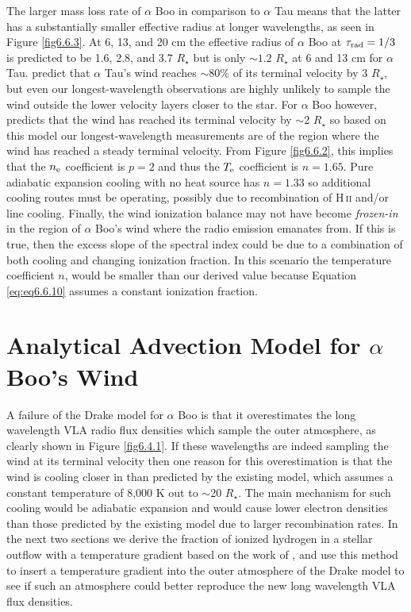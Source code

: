 The larger mass loss rate of $\alpha$ Boo in comparison to $\alpha$ Tau means that the latter has a substantially smaller effective radius at longer wavelengths, as seen in Figure \ref{fig6.6.3}. At 6, 13, and 20 cm the effective radius of $\alpha$ Boo at $\tau _{\rm{rad}}=1/3$ is predicted to be 1.6, 2.8, and 3.7 $R_{\star}$ but is only $\sim 1.2$ $R_{\star}$ at 6 and 13 cm for $\alpha$ Tau. \cite{robinson_1998} predict that $\alpha$ Tau's wind reaches $\sim$80\% of its terminal velocity by 3 $R_{\star}$, but even our longest-wavelength observations are highly unlikely to sample the wind outside the lower velocity layers closer to the star. For $\alpha$ Boo however, \cite{drake_1985} predicts that the wind has reached its terminal velocity by $\sim$2 $R_{\star}$ so based on this model our longest-wavelength measurements are of the region where the wind has reached a steady terminal velocity. From Figure \ref{fig6.6.2}, this implies that the $n_{\rm{e}}$ coefficient is $p=2$ and thus the $T_{\rm{e}}$ coefficient is $n=1.65$. Pure adiabatic expansion cooling with no heat source has $n=1.33$ so additional cooling routes must be operating, possibly due to recombination of H\,\textsc{ii} and/or line cooling. Finally, the wind ionization balance may not have become \textit{frozen-in} in the region of $\alpha$ Boo's wind where the radio emission emanates from. If this is true, then the excess slope of the spectral index could be due to a combination of both cooling and changing ionization fraction. In this scenario the temperature coefficient $n$, would be smaller than our derived value because Equation \ref{eq:eq6.6.10} assumes a constant ionization fraction.

\section{Analytical Advection Model for $\alpha$ Boo's Wind}
\label{sec:6.7}
A failure of the Drake model for $\alpha$ Boo is that it overestimates the long wavelength VLA radio flux densities which sample the outer atmosphere, as clearly shown in Figure \ref{fig6.4.1}. If these wavelengths are indeed sampling the wind at its terminal velocity then one reason for this overestimation is that the wind is cooling closer in than predicted by the existing model, which assumes a constant temperature of 8,000 K out to $\sim$20 $R_{\star}$. The main mechanism for such cooling would be adiabatic expansion \citep{ogorman_2011} and would cause lower electron densities than those predicted by the existing model due to larger recombination rates. In the next two sections we derive the fraction of ionized hydrogen in a stellar outflow with a temperature gradient based on the work of \cite{glassgold_1986}, and use this method to insert a temperature gradient into the outer atmosphere of the Drake model to see if such an atmosphere could better reproduce the new long wavelength VLA flux densities.

